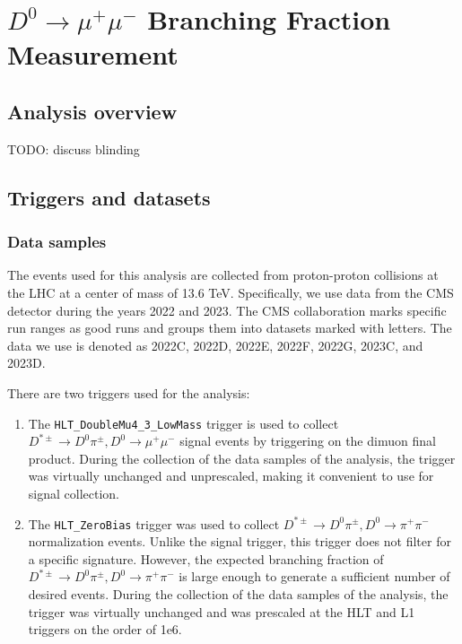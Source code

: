 \chapter{$D^0 \to \mu^+\mu^-$ Branching Fraction Measurement}

\section{Analysis overview}

\label{sec:analysis_overview}

TODO: discuss blinding

\section{Triggers and datasets}

\subsection{Data samples}

\label{subsec:data_samples}

The events used for this analysis are collected from proton-proton collisions at the LHC at a center of mass of 13.6 TeV. Specifically, we use data from the CMS detector during the years 2022 and 2023. The CMS collaboration marks specific run ranges as good runs and groups them into datasets marked with letters. The data we use is denoted as 2022C, 2022D, 2022E, 2022F, 2022G, 2023C, and 2023D. 

There are two triggers used for the analysis:
\begin{enumerate}
    \item The \texttt{HLT\_DoubleMu4\_3\_LowMass} trigger is used to collect $D^{*\pm} \to D^0 \pi^\pm, D^0 \to \mu^+ \mu^-$ signal events by triggering on the dimuon final product. During the collection of the data samples of the analysis, the trigger was virtually unchanged and unprescaled, making it convenient to use for signal collection.
    \item The \texttt{HLT\_ZeroBias} trigger was used to collect $D^{*\pm} \to D^0 \pi^\pm, D^0 \to \pi^+ \pi^-$ normalization events. Unlike the signal trigger, this trigger does not filter for a specific signature. However, the expected branching fraction of $D^{*\pm} \to D^0 \pi^\pm, D^0 \to \pi^+ \pi^-$ is large enough to generate a sufficient number of desired events. During the collection of the data samples of the analysis, the trigger was virtually unchanged and was prescaled at the HLT and L1 triggers on the order of 1e6. 
\end{enumerate}

